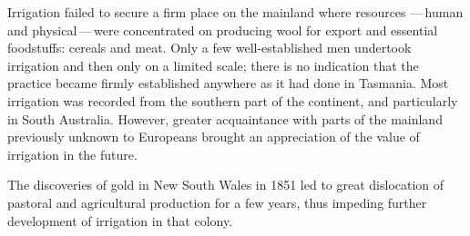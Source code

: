 \closure
Irrigation failed to secure a firm place on the mainland where
resources ---\,human and physical\,---\,were concentrated on producing
wool for export and essential foodstuffs: cereals and meat.  Only a
few well-established men undertook irrigation and then only on a
limited scale; there is no indication that the practice became firmly
established anywhere as it had done in Tasmania.  Most irrigation was
recorded from the southern part of the continent, and particularly in
South Australia.  However, greater acquaintance with parts of the
mainland previously unknown to Europeans brought an appreciation of
the value of irrigation in the future.

The discoveries of gold in New South Wales in 1851 led to great
dislocation of pastoral and agricultural production for a few years,
thus impeding further development of irrigation in that colony.

